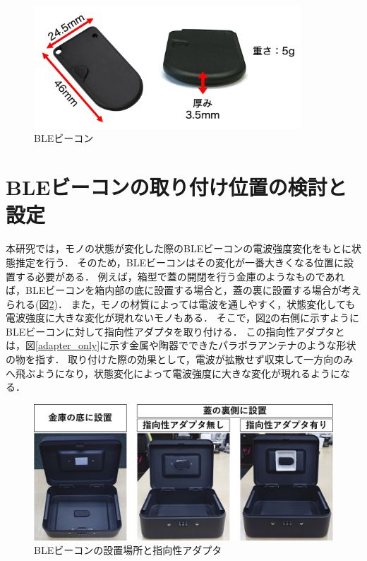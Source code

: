 \begin{figure}[tbh]
    \centering
    \includegraphics[width=10cm]{images/chapter3/BLE_beacon_info.jpg}
    \caption{BLEビーコン}
    \label{beacon}
\end{figure}




\section{BLEビーコンの取り付け位置の検討と設定}
本研究では，モノの状態が変化した際のBLEビーコンの電波強度変化をもとに状態推定を行う．
そのため，BLEビーコンはその変化が一番大きくなる位置に設置する必要がある．
例えば，箱型で蓋の開閉を行う金庫のようなものであれば，BLEビーコンを箱内部の底に設置する場合と，蓋の裏に設置する場合が考えられる(図\ref{adapter})．
また，モノの材質によっては電波を通しやすく，状態変化しても電波強度に大きな変化が現れないモノもある．
そこで，図\ref{adapter}の右側に示すようにBLEビーコンに対して指向性アダプタを取り付ける．
この指向性アダプタとは，図\ref{adapter_only}に示す金属や陶器でできたパラボラアンテナのような形状の物を指す．
取り付けた際の効果として，電波が拡散せず収束して一方向のみへ飛ぶようになり，状態変化によって電波強度に大きな変化が現れるようになる．


\begin{figure}[H]
    \centering
    \includegraphics[width=12cm]{images/chapter3/adapta_compare.jpg}
    \caption{BLEビーコンの設置場所と指向性アダプタ}
    \label{adapter}
\end{figure}


